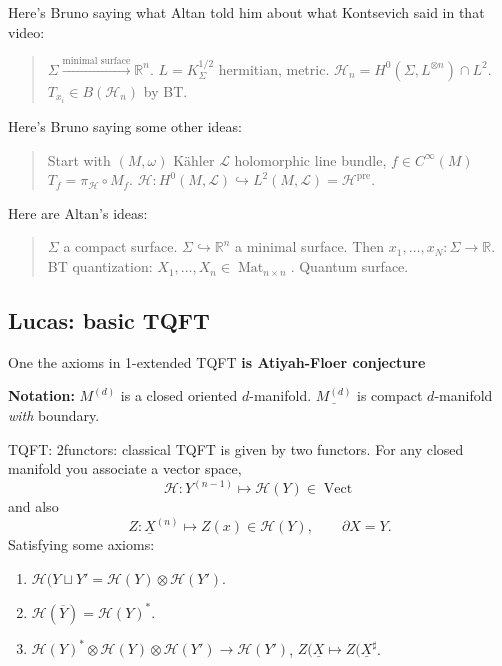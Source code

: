 Here's Bruno saying what Altan told him about what Kontsevich said in that
video:

\begin{quotation}
 \(\Sigma \xrightarrow{\text{minimal surface}} \mathbb{R}^n\).
 \(L=K_\Sigma^{1/2}\) hermitian, metric. \(\mathcal{H}_n=H^{0}(\Sigma,L^{\otimes
 n})\cap L^2\). \(T_{x_i}\in B(\mathcal{H}_n)\) by BT.
\end{quotation}

Here's Bruno saying some other ideas:
\begin{quotation}
 Start with \((M, \omega)\) Kähler \(\mathcal{L}\) holomorphic line bundle, \(f
 \in C^\infty (M)\) \( T_f=\pi_\mathcal{H} \circ M_f\). \(\mathcal{H}:
 H^{0}(M,\mathcal{L})\hookrightarrow
 L^2(M,\mathcal{L})=\mathcal{H}^{\operatorname{pre}}\).
\end{quotation}


Here are Altan's ideas:
\begin{quotation}
\(\Sigma\) a compact surface. \(\Sigma \hookrightarrow \mathbb{R}^n\) a minimal
surface. Then \(x_1,\ldots, x_N : \Sigma \to \mathbb{R}\). BT quantization:
\(X_1,\ldots,X_n \in \operatorname{Mat}_{n \times n}\). Quantum surface.
\end{quotation}

\subsection{Lucas: basic TQFT}

\begin{upshot}\leavevmode
One the axioms in 1-extended TQFT \textbf{is Atiyah-Floer conjecture} 
\end{upshot}

\textbf{Notation:} \(M^{(d)}\) is a closed oriented $d$-manifold.
\(\underline{M^{(d)}}\) is compact \(d\)-manifold \textit{with} boundary.

TQFT: 2functors: classical TQFT is given by two functors. For any closed
manifold you associate a vector space,
\[\mathcal{H}:Y^{(n-1)}\mapsto \mathcal{H}(Y) \in \operatorname{Vect}\]
and also
\[Z: \underline{X}^{(n) }\mapsto Z(x) \in \mathcal{H}(Y), \qquad \partial X=Y.\]
Satisfying some axioms:

\begin{enumerate}
\item \(\mathcal{H}(Y \sqcup Y'=\mathcal{H} (Y) \otimes \mathcal{H}(Y')\).
\item  \(\mathcal{H}(\overline{Y}) = \mathcal{H}(Y)^*\).
\item \(\mathcal{H}(Y)^* \otimes \mathcal{H}(Y)\otimes \mathcal{H}(Y')\to
\mathcal{H}(Y')\), \(Z(\underline{X}\mapsto Z(\underline{X}^\sharp\).
\end{enumerate}

